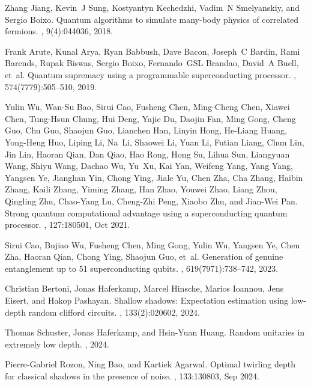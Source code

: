 \documentclass[showpacs,twocolumn,aps,prx,long bibliography,superscriptaddress,notitlepage]{revtex4-1}
\begin{document}
\begin{thebibliography}{10}
Zhang Jiang, Kevin~J Sung, Kostyantyn Kechedzhi, Vadim~N Smelyanskiy, and
  Sergio Boixo.
\newblock Quantum algorithms to simulate many-body physics of correlated
  fermions.
, 9(4):044036, 2018.

Frank Arute, Kunal Arya, Ryan Babbush, Dave Bacon, Joseph~C Bardin, Rami
  Barends, Rupak Biswas, Sergio Boixo, Fernando~GSL Brandao, David~A Buell,
  et~al.
\newblock Quantum supremacy using a programmable superconducting processor.
, 574(7779):505--510, 2019.

Yulin Wu, Wan-Su Bao, Sirui Cao, Fusheng Chen, Ming-Cheng Chen, Xiawei Chen,
  Tung-Hsun Chung, Hui Deng, Yajie Du, Daojin Fan, Ming Gong, Cheng Guo, Chu
  Guo, Shaojun Guo, Lianchen Han, Linyin Hong, He-Liang Huang, Yong-Heng Huo,
  Liping Li, Na~Li, Shaowei Li, Yuan Li, Futian Liang, Chun Lin, Jin Lin,
  Haoran Qian, Dan Qiao, Hao Rong, Hong Su, Lihua Sun, Liangyuan Wang, Shiyu
  Wang, Dachao Wu, Yu~Xu, Kai Yan, Weifeng Yang, Yang Yang, Yangsen Ye,
  Jianghan Yin, Chong Ying, Jiale Yu, Chen Zha, Cha Zhang, Haibin Zhang, Kaili
  Zhang, Yiming Zhang, Han Zhao, Youwei Zhao, Liang Zhou, Qingling Zhu,
  Chao-Yang Lu, Cheng-Zhi Peng, Xiaobo Zhu, and Jian-Wei Pan.
\newblock Strong quantum computational advantage using a superconducting
  quantum processor.
, 127:180501, Oct 2021.

Sirui Cao, Bujiao Wu, Fusheng Chen, Ming Gong, Yulin Wu, Yangsen Ye, Chen Zha,
  Haoran Qian, Chong Ying, Shaojun Guo, et~al.
\newblock Generation of genuine entanglement up to 51 superconducting qubits.
, 619(7971):738--742, 2023.

Christian Bertoni, Jonas Haferkamp, Marcel Hinsche, Marios Ioannou, Jens
  Eisert, and Hakop Pashayan.
\newblock Shallow shadows: Expectation estimation using low-depth random
  clifford circuits.
, 133(2):020602, 2024.

Thomas Schuster, Jonas Haferkamp, and Hsin-Yuan Huang.
\newblock Random unitaries in extremely low depth.
, 2024.

Pierre-Gabriel Rozon, Ning Bao, and Kartiek Agarwal.
\newblock Optimal twirling depth for classical shadows in the presence of
  noise.
, 133:130803, Sep 2024.


\end{thebibliography}
\end{document}
